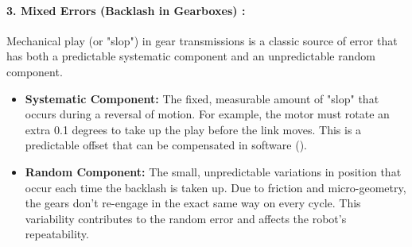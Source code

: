 \paragraph{3. Mixed Errors (Backlash in Gearboxes) :}
Mechanical play (or "slop") in gear transmissions is a classic source of error that has both a predictable systematic component and an unpredictable random component.

\begin{itemize}
    \item \textbf{Systematic Component:} The fixed, measurable amount of "slop" that occurs during a reversal of motion. For example, the motor must rotate an extra 0.1 degrees to take up the play before the link moves. This is a predictable offset that can be compensated in software ().

    \item \textbf{Random Component:} The small, unpredictable variations in position that occur each time the backlash is taken up. Due to friction and micro-geometry, the gears don't re-engage in the exact same way on every cycle. This variability contributes to the random error and affects the robot's repeatability.
\end{itemize}

